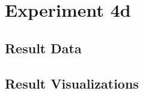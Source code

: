 \section{Experiment 4d}
\label{sec:A_Exp4d}
	\subsection{Result Data}
	\label{sec:A_Exp4d_Data}
	\subsection{Result Visualizations}
	\label{sec:A_Exp4d_Diagrams}